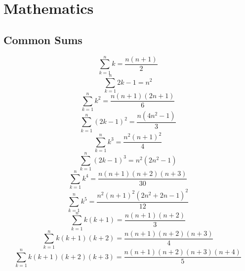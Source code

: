 
\chapter{Mathematics}
\chapterinfo{}
	\section{Common Sums}
	
	$$\sum_{k=1}^{n}k = \frac{n(n+1)}{2}$$
	$$\sum_{k=1}^{n}2k-1 = n^2$$
	$$\sum_{k=1}^{n}k^2 = \frac{n(n+1)(2n+1)}{6}$$
	$$\sum_{k=1}^{n}(2k-1)^2 = \frac{n(4n^2-1)}{3}$$
	$$\sum_{k=1}^{n}k^3 = \frac{n^2(n+1)^2}{4}$$
	$$\sum_{k=1}^{n}(2k-1)^3 = n^2(2n^2-1)$$
	$$\sum_{k=1}^{n}k^4 = \frac{n(n+1)(n+2)(n+3)}{30}$$
	$$\sum_{k=1}^{n}k^5 = \frac{n^2(n+1)^2(2n^2+2n-1)^2}{12}$$
	$$\sum_{k=1}^{n}k(k+1) = \frac{n(n+1)(n+2)}{3}$$
	$$\sum_{k=1}^{n}k(k+1)(k+2) = \frac{n(n+1)(n+2)(n+3)}{4}$$
	$$\sum_{k=1}^{n}k(k+1)(k+2)(k+3) = \frac{n(n+1)(n+2)(n+3)(n+4)}{5}$$
	
